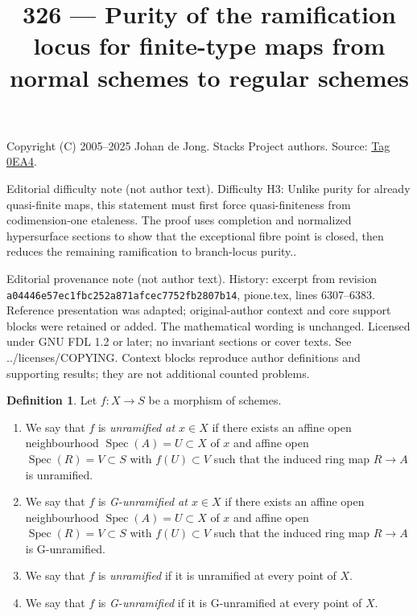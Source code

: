 \documentclass{amsart}
\theoremstyle{plain}
\theoremstyle{definition}
\newtheorem{definition}[subsection]{Definition}
\theoremstyle{remark}
\numberwithin{equation}{subsection}
\def\Spec{\mathop{\mathrm{Spec}}}
\begin{document}
\title[Stacks Project, Tag 0EA4]{326 --- Purity of the ramification locus for finite-type maps from normal schemes to regular schemes}
\maketitle
\noindent Copyright (C) 2005--2025 Johan de Jong. Stacks Project authors. Source: \href{https://stacks.math.columbia.edu/tag/0EA4}{Tag 0EA4}.

\noindent Editorial difficulty note (not author text). Difficulty H3: Unlike purity for already quasi-finite maps, this statement must first force quasi-finiteness from codimension-one etaleness. The proof uses completion and normalized hypersurface sections to show that the exceptional fibre point is closed, then reduces the remaining ramification to branch-locus purity..

\noindent Editorial provenance note (not author text). History: excerpt from revision \texttt{a0444\allowbreak 6e57e\allowbreak c1fbc\allowbreak 252a8\allowbreak 71afc\allowbreak ec775\allowbreak 2fb28\allowbreak 07b14}, pione.tex, lines 6307--6383. Reference presentation was adapted; original-author context and core support blocks were retained or added. The mathematical wording is unchanged. Licensed under GNU FDL 1.2 or later; no invariant sections or cover texts. See ../licenses/COPYING. Context blocks reproduce author definitions and supporting results; they are not additional counted problems.

\begin{definition}
\label{morphisms-definition-unramified}
Let $f : X \to S$ be a morphism of schemes.
\begin{enumerate}
\item We say that $f$ is {\it unramified at $x \in X$} if
there exists an affine open neighbourhood $\Spec(A) = U \subset X$
of $x$ and affine open $\Spec(R) = V \subset S$
with $f(U) \subset V$ such that the induced ring map
$R \to A$ is unramified.
\item We say that $f$ is {\it G-unramified at $x \in X$} if
there exists an affine open neighbourhood $\Spec(A) = U \subset X$
of $x$ and affine open $\Spec(R) = V \subset S$
with $f(U) \subset V$ such that the induced ring map
$R \to A$ is G-unramified.
\item We say that $f$ is {\it unramified} if it is unramified
at every point of $X$.
\item We say that $f$ is {\it G-unramified} if it is G-unramified
at every point of $X$.
\end{enumerate}
\end{definition}
\end{document}
